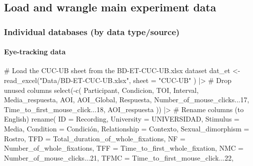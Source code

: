 \documentclass[
  bookmarksnumbered]{article}
\newenvironment{Shaded}{\begin{snugshade}}{\end{snugshade}}
\newcommand{\AttributeTok}[1]{\textcolor[rgb]{0.80,0.80,0.80}{#1}}
\newcommand{\CommentTok}[1]{\textcolor[rgb]{0.50,0.62,0.50}{#1}}
\newcommand{\DecValTok}[1]{\textcolor[rgb]{0.86,0.86,0.80}{#1}}
\newcommand{\FunctionTok}[1]{\textcolor[rgb]{0.94,0.94,0.56}{#1}}
\newcommand{\NormalTok}[1]{\textcolor[rgb]{0.80,0.80,0.80}{#1}}
\newcommand{\OtherTok}[1]{\textcolor[rgb]{0.94,0.94,0.56}{#1}}
\newcommand{\SpecialCharTok}[1]{\textcolor[rgb]{0.86,0.64,0.64}{#1}}
\newcommand{\StringTok}[1]{\textcolor[rgb]{0.80,0.58,0.58}{#1}}
\begin{document}
\subsection{Load and wrangle main experiment data}\label{load-and-wrangle-main-experiment-data}

\subsubsection{Individual databases (by data type/source)}\label{individual-databases-by-data-typesource}

\paragraph{Eye-tracking data}\label{eye-tracking-data}

\begin{Shaded}
\begin{Highlighting}[]
\CommentTok{\# Load the \textquotesingle{}CUC{-}UB\textquotesingle{} sheet from the \textquotesingle{}BD{-}ET{-}CUC{-}UB.xlsx\textquotesingle{} dataset}
\NormalTok{dat\_et }\OtherTok{\textless{}{-}} \FunctionTok{read\_excel}\NormalTok{(}\StringTok{"Data/BD{-}ET{-}CUC{-}UB.xlsx"}\NormalTok{,}
                     \AttributeTok{sheet =} \StringTok{"CUC{-}UB"}
\NormalTok{) }\SpecialCharTok{|\textgreater{}}
  \CommentTok{\# Drop unused columns}
  \FunctionTok{select}\NormalTok{(}\SpecialCharTok{{-}}\FunctionTok{c}\NormalTok{(}
\NormalTok{    Participant, Condicion, TOI, Interval, Media\_respuesta, AOI,}
\NormalTok{    AOI\_Global, Respuesta, Number\_of\_mouse\_clicks...}\DecValTok{17}\NormalTok{,}
\NormalTok{    Time\_to\_first\_mouse\_click...}\DecValTok{18}\NormalTok{, AOI\_respuesta}
\NormalTok{  )) }\SpecialCharTok{|\textgreater{}}
  \CommentTok{\# Rename columns (to English)}
  \FunctionTok{rename}\NormalTok{(}
    \AttributeTok{ID =}\NormalTok{ Recording,}
    \AttributeTok{University =}\NormalTok{ UNIVERSIDAD,}
    \AttributeTok{Stimulus =}\NormalTok{ Media,}
    \AttributeTok{Condition =}\NormalTok{ Condición,}
    \AttributeTok{Relationship =}\NormalTok{ Contexto,}
    \AttributeTok{Sexual\_dimorphism =}\NormalTok{ Rostro,}
    \AttributeTok{TFD =}\NormalTok{ Total\_duration\_of\_whole\_fixations,}
    \AttributeTok{NF =}\NormalTok{ Number\_of\_whole\_fixations,}
    \AttributeTok{TFF =}\NormalTok{ Time\_to\_first\_whole\_fixation,}
    \AttributeTok{NMC =}\NormalTok{ Number\_of\_mouse\_clicks...}\DecValTok{21}\NormalTok{,}
    \AttributeTok{TFMC =}\NormalTok{ Time\_to\_first\_mouse\_click...}\DecValTok{22}\NormalTok{,}

\end{Highlighting}
\end{Shaded}
\end{document}
